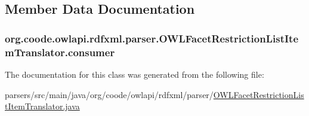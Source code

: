 \subsection{Member Data Documentation}
\hypertarget{classorg_1_1coode_1_1owlapi_1_1rdfxml_1_1parser_1_1_o_w_l_facet_restriction_list_item_translator_a6a7c4378be98789d2daab67b7bc2fb39}{
\subsubsection[{consumer}]{ org.\-coode.\-owlapi.\-rdfxml.\-parser.\-O\-W\-L\-Facet\-Restriction\-List\-Item\-Translator.\-consumer\hspace{0.3cm}{\ttfamily [private]}}}\label{classorg_1_1coode_1_1owlapi_1_1rdfxml_1_1parser_1_1_o_w_l_facet_restriction_list_item_translator_a6a7c4378be98789d2daab67b7bc2fb39}


The documentation for this class was generated from the following file\-:\begin{DoxyCompactItemize}
\item 
parsers/src/main/java/org/coode/owlapi/rdfxml/parser/\hyperlink{_o_w_l_facet_restriction_list_item_translator_8java}{O\-W\-L\-Facet\-Restriction\-List\-Item\-Translator.\-java}\end{DoxyCompactItemize}

